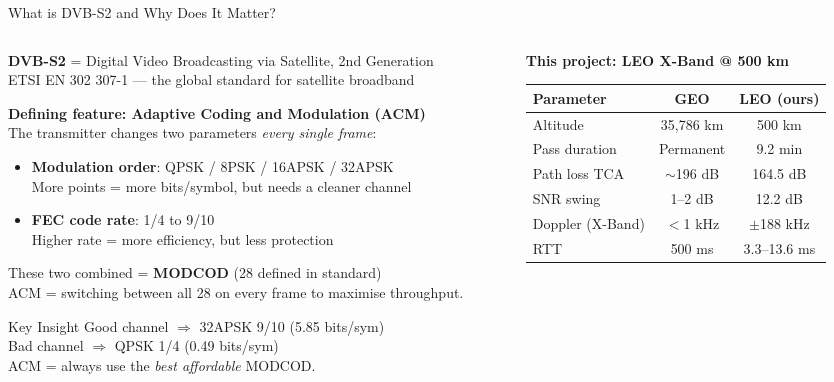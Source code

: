 \documentclass[aspectratio=169,10pt]{beamer}
\begin{document}
\begin{frame}[shrink=15]{What is DVB-S2 and Why Does It Matter?}
  \begin{columns}[T]
    \begin{column}{0.52\textwidth}
      \textbf{DVB-S2} = Digital Video Broadcasting via Satellite, 2nd Generation\\
      {\scriptsize ETSI EN 302 307-1 — the global standard for satellite broadband}
      \vspace{0.4em}

      \textbf{Defining feature: Adaptive Coding and Modulation (ACM)}\\
      The transmitter changes two parameters \emph{every single frame}:
      \begin{itemize}\scriptsize
        \item \textbf{Modulation order}: QPSK / 8PSK / 16APSK / 32APSK\\
              More points = more bits/symbol, but needs a cleaner channel
        \item \textbf{FEC code rate}: 1/4 to 9/10\\
              Higher rate = more efficiency, but less protection
      \end{itemize}
      \vspace{0.4em}
      These two combined = \alert{\textbf{MODCOD}} (28 defined in standard)\\
      ACM = switching between all 28 on every frame to maximise throughput.

      \vspace{0.4em}
      \begin{keybox}{Key Insight}
        \scriptsize Good channel $\Rightarrow$ 32APSK 9/10 (5.85 bits/sym)\\
        Bad channel $\Rightarrow$ QPSK 1/4 (0.49 bits/sym)\\
        ACM = always use the \emph{best affordable} MODCOD.
      \end{keybox}
    \end{column}
    \begin{column}{0.44\textwidth}
      \textbf{This project: LEO X-Band @ 500 km}
      \vspace{0.3em}

      {\scriptsize
      \begin{tabular}{lcc}
        \toprule
        \textbf{Parameter} & \textbf{GEO} & \textbf{LEO (ours)}\\
        \midrule
        Altitude        & 35,786 km & \alert{500 km} \\
        Pass duration   & Permanent & \alert{9.2 min} \\
        Path loss TCA   & $\sim$196 dB & \alert{164.5 dB} \\
        SNR swing       & 1--2 dB   & \alert{12.2 dB} \\
        Doppler (X-Band)& $<$1 kHz  & \alert{$\pm$188 kHz} \\
        RTT             & 500 ms    & \alert{3.3--13.6 ms} \\
        \bottomrule
      \end{tabular}}


\end{column}
\end{columns}
\end{frame}
\end{document}

